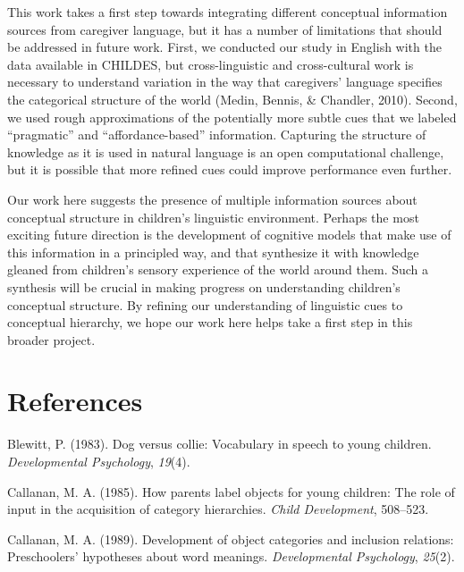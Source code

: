 \documentclass[english,,man,floatsintext]{apa6}
\begin{document}
This work takes a first step towards integrating different conceptual information sources from caregiver language, but it has a number of limitations that should be addressed in future work. First, we conducted our study in English with the data available in CHILDES, but cross-linguistic and cross-cultural work is necessary to understand variation in the way that caregivers' language specifies the categorical structure of the world (Medin, Bennis, \& Chandler, 2010). Second, we used rough approximations of the potentially more subtle cues that we labeled \enquote{pragmatic} and \enquote{affordance-based} information. Capturing the structure of knowledge as it is used in natural language is an open computational challenge, but it is possible that more refined cues could improve performance even further.

Our work here suggests the presence of multiple information sources about conceptual structure in children's linguistic environment. Perhaps the most exciting future direction is the development of cognitive models that make use of this information in a principled way, and that synthesize it with knowledge gleaned from children's sensory experience of the world around them. Such a synthesis will be crucial in making progress on understanding children's conceptual structure. By refining our understanding of linguistic cues to conceptual hierarchy, we hope our work here helps take a first step in this broader project.

\hypertarget{references}{%
\section{References}\label{references}}

\setlength{\parindent}{-0.5in}
\setlength{\leftskip}{0.5in}

\hypertarget{refs}{}
\leavevmode\hypertarget{ref-blewitt1983}{}%
Blewitt, P. (1983). Dog versus collie: Vocabulary in speech to young children. \emph{Developmental Psychology}, \emph{19}(4).

\leavevmode\hypertarget{ref-callanan1985}{}%
Callanan, M. A. (1985). How parents label objects for young children: The role of input in the acquisition of category hierarchies. \emph{Child Development}, 508--523.

\leavevmode\hypertarget{ref-callanan1989}{}%
Callanan, M. A. (1989). Development of object categories and inclusion relations: Preschoolers' hypotheses about word meanings. \emph{Developmental Psychology}, \emph{25}(2).
\end{document}
